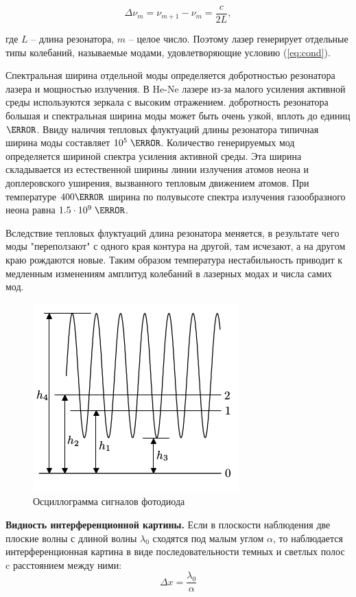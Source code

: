\documentclass[a4paper,12pt]{article}
\begin{document}
\begin{equation}
\label{eq:cond}
\Delta \nu_{m}=\nu_{m+1}-\nu_{m}=\dfrac{c}{2L},
\end{equation}

где $L$ -- длина резонатора, $m$ -- целое число. Поэтому лазер генерирует отдельные типы колебаний, называемые модами, удовлетворяющие условию (\ref{eq:cond}). 

Спектральная ширина отдельной моды определяется добротностью резонатора лазера и мощностью излучения. В He-Ne лазере из-за малого усиления активной среды используются зеркала с высоким отражением. добротность резонатора большая и спектральная ширина моды может быть очень узкой, вплоть до единиц $\Hz$. Ввиду наличия тепловых флуктуаций длины резонатора типичная ширина моды составляет $10^5 \; \Hz$. Количество генерируемых мод определяется шириной спектра усиления активной среды. Эта ширина складывается из естественной ширины линии излучения атомов неона и доплеровского уширения, вызванного тепловым движением атомов. При температуре $400 \K$ ширина по полувысоте спектра излучения газообразного неона равна $1.5 \cdot 10^{9} \; \Hz$.

Вследствие тепловых флуктуаций длина резонатора меняется, в результате чего моды "переползают" с одного края контура на другой, там исчезают, а на другом краю рождаются новые. Таким образом температура нестабильность приводит к медленным изменениям амплитуд колебаний в лазерных модах и числа самих мод.

\begin{figure}[h!]
	\begin{center}
		\includegraphics[scale = 0.5]{img1.png}
	\end{center}
	\caption{Осциллограмма сигналов фотодиода}
\end{figure}


\textbf{Видность интерференционной картины.} Если в плоскости наблюдения две плоские волны с длиной волны $\lambda_{0}$ сходятся под малым углом $\alpha$, то наблюдается интерференционная картина в виде последовательности темных и светлых полос c расстоянием между ними:
\begin{equation}
\label{eq:deltax}
\Delta x = \dfrac{\lambda_{0}}{\alpha}
\end{equation}
\end{document}
